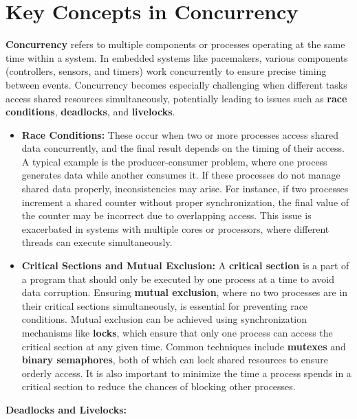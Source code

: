 \documentclass[
  14pt,
  a4paper,
  numbers=noendperiod,
  headinclude=true,
  footinclude=true,
  DIV=calc]{scrreprt}
\begin{document}
\section{Key Concepts in Concurrency}\label{key-concepts-in-concurrency}

\textbf{Concurrency} refers to multiple components or processes
operating at the same time within a system. In embedded systems like
pacemakers, various components (controllers, sensors, and timers) work
concurrently to ensure precise timing between events. Concurrency
becomes especially challenging when different tasks access shared
resources simultaneously, potentially leading to issues such as
\textbf{race conditions}, \textbf{deadlocks}, and \textbf{livelocks}.

\begin{itemize}
\item
  \textbf{Race Conditions:} These occur when two or more processes
  access shared data concurrently, and the final result depends on the
  timing of their access. A typical example is the producer-consumer
  problem, where one process generates data while another consumes it.
  If these processes do not manage shared data properly, inconsistencies
  may arise. For instance, if two processes increment a shared counter
  without proper synchronization, the final value of the counter may be
  incorrect due to overlapping access. This issue is exacerbated in
  systems with multiple cores or processors, where different threads can
  execute simultaneously.
\item
  \textbf{Critical Sections and Mutual Exclusion:} A \textbf{critical
  section} is a part of a program that should only be executed by one
  process at a time to avoid data corruption. Ensuring \textbf{mutual
  exclusion}, where no two processes are in their critical sections
  simultaneously, is essential for preventing race conditions. Mutual
  exclusion can be achieved using synchronization mechanisms like
  \textbf{locks}, which ensure that only one process can access the
  critical section at any given time. Common techniques include
  \textbf{mutexes} and \textbf{binary semaphores}, both of which can
  lock shared resources to ensure orderly access. It is also important
  to minimize the time a process spends in a critical section to reduce
  the chances of blocking other processes.
\end{itemize}

\textbf{Deadlocks and Livelocks:}
\end{document}
